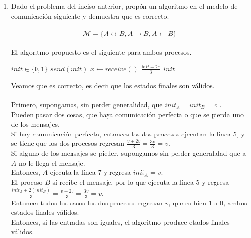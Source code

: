 \documentclass[12pt,a4paper]{report}
\begin{document}
\begin{enumerate}
{
	}
	\item {
	Dado el problema del inciso anterior, propón un algoritmo en el modelo de
	comunicación siguiente y demuestra que es correcto.\\\\
		\begin{equation*}
			\mathcal{M} = \{A \leftrightarrow B, A \rightarrow B, A \leftarrow B \}
		\end{equation*}\\
	El algoritmo propuesto es el siguiente para ambos procesos.\\
		\begin{algorithmic}[1]
			\Require $init \in \{0, 1\}$
				\State $send(init)$
				\State $x \gets receive()$
					\State \Return $\frac{init + 2x}{3}$
				\Else
					\State \Return $init$
				\EndIf
			\EndFunction
		\end{algorithmic}

	Veamos que es correcto, es decir que los estados finales son válidos.\\\\

	Primero, supongamos, sin perder generalidad, que $init_A = init_B = v$ .\\
	Pueden pasar dos cosas, que haya comunicación perfecta o que se pierda uno
	de los mensajes.\\
	Si hay comunicación perfecta, entonces los dos procesos ejecutan la línea 5,
	y se tiene que los dos procesos regresan $\frac{v + 2v}{3} = \frac{3v}{3} = v$.\\
	Si alguno de los mensajes se pieder, supongamos sin perder generalidad que a $A$
	no le llega el mensaje.\\
	Entonces, $A$ ejecuta la línea 7 y regresa $init_A = v$.\\
	El proceso $B$ sí recibe el mensaje, por lo que ejecuta la línea 5 y regresa
	$\frac{init_A + 2 (init_B)}{3} = \frac{v + 2v}{3} = \frac{3v}{3} = v$.\\
	Entonces todos los casos los dos procesos regresan $v$, que es bien 1 o 0,
	ambos estados finales válidos.\\
	Entonces, si las entradas son iguales, el algoritmo produce etados finales válidos.\\\\

}
\end{enumerate}
\end{document}

